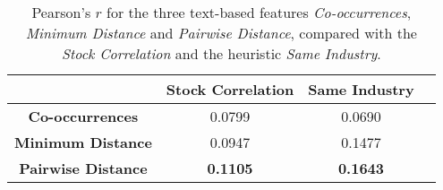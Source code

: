\begin{table*}
    \centering
    \setlength{\tabcolsep}{0pt} %
    
    \begin{tabular*}{0.8\textwidth}{@{\extracolsep{\fill}}cccc}
        \toprule
        {} &  Stock Correlation &  Same Industry \\
        \midrule
        \textbf{Co-occurrences}     & 0.0799 & 0.0690 \\
        \textbf{Minimum Distance}   & 0.0947 & 0.1477 \\
        \textbf{Pairwise Distance}  & \textbf{0.1105} & \textbf{0.1643} \\
        \bottomrule
    \end{tabular*}
    
    \caption{Pearson's $r$ for the three text-based features \emph{Co-occurrences}, \emph{Minimum Distance} and \emph{Pairwise Distance}, compared with the \emph{Stock Correlation} and the heuristic \emph{Same Industry}.}
    \label{table:corr-text-r}
\end{table*}


